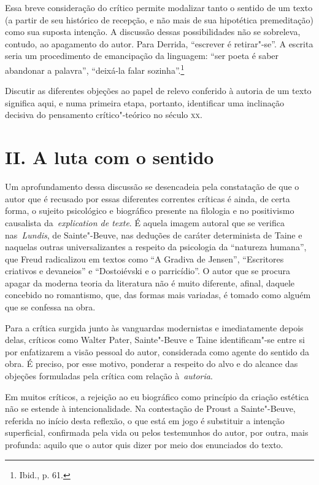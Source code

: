 Essa breve consideração do crítico permite modalizar tanto o sentido de
um texto (a partir de seu histórico de recepção, e não mais de sua
hipotética premeditação) como sua suposta intenção. A discussão dessas
possibilidades não se sobreleva, contudo, ao apagamento do autor. Para
Derrida, ``escrever é retirar"-se''. A escrita seria um procedimento de
emancipação da linguagem: ``ser poeta é saber abandonar a palavra'',
``deixá-la falar sozinha''.\footnote{Ibid., p. 61.}

Discutir as diferentes objeções ao papel de relevo conferido à autoria
de um texto significa aqui, e numa primeira etapa, portanto, identificar
uma inclinação decisiva do pensamento crítico"-teórico no século
\textsc{xx}.

\pagebreak

\section*{II. A luta com o sentido}

Um aprofundamento dessa discussão se desencadeia pela constatação de que
o autor que é recusado por essas diferentes correntes críticas é ainda,
de certa forma, o sujeito psicológico e biográfico presente na filologia
e no positivismo causalista da~\emph{explication de texte}. É aquela
imagem autoral que se verifica nas\emph{~Lundis}, de Sainte"-Beuve, nas
deduções de caráter determinista de Taine e naquelas outras
universalizantes a respeito da psicologia da ``natureza humana'', que
Freud radicalizou em textos como ``A Gradiva de Jensen'', ``Escritores
criativos e devaneios'' e ``Dostoiévski e o parricídio''. O autor que se
procura apagar da moderna teoria da literatura não é muito diferente,
afinal, daquele concebido no romantismo, que, das formas mais variadas,
é tomado como alguém que se confessa na obra.

Para a crítica surgida junto às vanguardas modernistas e imediatamente
depois delas, críticos como Walter Pater, Sainte"-Beuve e Taine
identificam"-se entre si por enfatizarem a visão pessoal do autor,
considerada como agente do sentido da obra. É preciso, por esse motivo,
ponderar a respeito do alvo e do alcance das objeções formuladas pela
crítica com relação à~\emph{autoria}.

Em muitos críticos, a rejeição ao eu biográfico como princípio da
criação estética não se estende à intencionalidade. Na contestação de
Proust a Sainte"-Beuve, referida no início desta reflexão, o que está em
jogo é substituir a intenção superficial, confirmada pela vida ou pelos
testemunhos do autor, por outra, mais profunda: aquilo que o autor quis
dizer por meio dos enunciados do texto.


